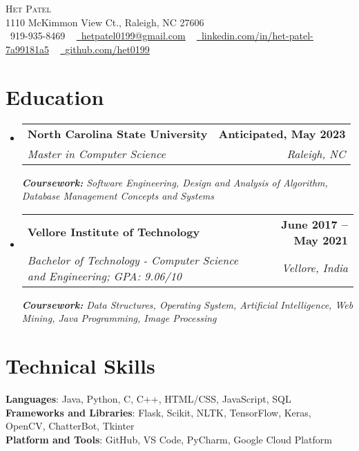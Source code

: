 \documentclass[letterpaper,11pt]{article}
\makeatletter
\newcommand{\resumeSubheading}[4]{
  \vspace{-2pt}\item
    \begin{tabular*}{1.0\textwidth}[t]{l@{\extracolsep{\fill}}r}
      \textbf{#1} & \textbf{\small #2} \\
      \textit{\small#3} & \textit{\small #4} \\
    \end{tabular*}\vspace{-7pt}
}
\newcommand{\resumeSubHeadingListStart}{\begin{itemize}[leftmargin=0.0in, label={}]}
\newcommand{\resumeSubHeadingListEnd}{\end{itemize}}
\makeatother
\begin{document}
\begin{center}
    {\Huge \scshape Het Patel} \\ \vspace{1pt}
    1110 McKimmon View Ct., Raleigh, NC 27606 \\ \vspace{1pt}
    \small \raisebox{-0.1\height}\faPhone\ 919-935-8469 ~ \href{mailto:x@gmail.com}{\raisebox{-0.2\height}\faEnvelope\  \underline{hetpatel0199@gmail.com}} ~ 
    \href{https://linkedin.com/in//}{\raisebox{-0.2\height}\faLinkedin\ \underline{linkedin.com/in/het-patel-7a99181a5}}  ~
    \href{https://github.com/}{\raisebox{-0.2\height}\faGithub\ \underline{github.com/het0199}}
    \vspace{-8pt}
\end{center}


\section{Education}
  \resumeSubHeadingListStart
    \resumeSubheading
      {North Carolina State University}{Anticipated, May 2023}
      {Master in Computer Science}{Raleigh, NC}
      {\scriptsize \textit{ \footnotesize{\newline{}\textbf{Coursework:} Software Engineering, Design and Analysis of Algorithm, Database Management Concepts and Systems}}}
  \resumeSubHeadingListEnd
  \vspace{-15pt}
  \resumeSubHeadingListStart
    \resumeSubheading
      {Vellore Institute of Technology}{June 2017 -- May 2021}
      {Bachelor of Technology - Computer Science and Engineering; GPA: 9.06/10}{Vellore, India}
      {\scriptsize \textit{ \footnotesize{\newline{}\textbf{Coursework:} Data Structures, Operating System, Artificial Intelligence, Web Mining, Java Programming, Image Processing}}}
  \resumeSubHeadingListEnd
\vspace{-18pt}
\section{Technical Skills}
 \begin{itemize}[leftmargin=0.15in, label={}]
    \small{\item{
     \textbf{Languages}{: Java, Python, C, C++, HTML/CSS, JavaScript, SQL} \\
     \textbf{Frameworks and Libraries}{: Flask, Scikit, NLTK, TensorFlow, Keras, OpenCV, ChatterBot, Tkinter} \\
     \textbf{Platform and Tools}{: GitHub, VS Code, PyCharm, Google Cloud Platform} \\
    }}
 \end{itemize}
 \vspace{-18pt}
\end{document}

